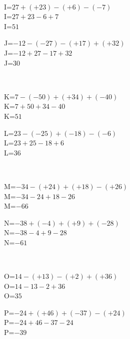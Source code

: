 \documentclass{article}%
\begin{document}
\\%
\begin{minipage}{0.5\textwidth}%
I=$27+(+23)-(+6)-(-7)$\\%
I=$27+23-6+7$\\%
I=$51$\\%
\end{minipage}%
\begin{minipage}{0.5\textwidth}%
J=$-12-(-27)-(+17)+(+32)$\\%
J=$-12+27-17+32$\\%
J=$30$\\%
\end{minipage}%
\\%
\begin{minipage}{0.5\textwidth}%
K=$7-(-50)+(+34)+(-40)$\\%
K=$7+50+34-40$\\%
K=$51$\\%
\end{minipage}%
\begin{minipage}{0.5\textwidth}%
L=$23-(-25)+(-18)-(-6)$\\%
L=$23+25-18+6$\\%
L=$36$\\%
\end{minipage}%
\\%
\begin{minipage}{0.5\textwidth}%
M=$-34-(+24)+(+18)-(+26)$\\%
M=$-34-24+18-26$\\%
M=$-66$\\%
\end{minipage}%
\begin{minipage}{0.5\textwidth}%
N=$-38+(-4)+(+9)+(-28)$\\%
N=$-38-4+9-28$\\%
N=$-61$\\%
\end{minipage}%
\\%
\begin{minipage}{0.5\textwidth}%
O=$14-(+13)-(+2)+(+36)$\\%
O=$14-13-2+36$\\%
O=$35$\\%
\end{minipage}%
\begin{minipage}{0.5\textwidth}%
P=$-24+(+46)+(-37)-(+24)$\\%
P=$-24+46-37-24$\\%
P=$-39$\\%
\end{minipage}%
\end{document}
